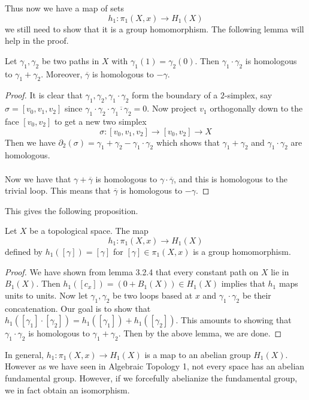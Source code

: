 \documentclass[a4paper]{article}
\begin{document}
Thus now we have a map of sets $$h_1:\pi_1(X,x)\to H_1(X)$$ we still need to show that it is a group homomorphism. The following lemma will help in the proof. 

\begin{lmm}{}{} Let $\gamma_1,\gamma_2$ be two paths in $X$ with $\gamma_1(1)=\gamma_2(0)$. Then $\gamma_1\cdot\gamma_2$ is homologous to $\gamma_1+\gamma_2$. Moreover, $\overline{\gamma}$ is homologous to $-\gamma$. \tcbline
\begin{proof}
It is clear that $\gamma_1,\gamma_2,\gamma_1\cdot\gamma_2$ form the boundary of a $2$-simplex, say $\sigma=[v_0,v_1,v_2]$ since $\gamma_1\cdot\gamma_2\cdot\overline{\gamma_1\cdot\gamma_2}=0$. Now project $v_1$ orthogonally down to the face $[v_0,v_2]$ to get a new two simplex $$\sigma:[v_0,v_1,v_2]\to[v_0,v_2]\to X$$ Then we have $\partial_2(\sigma)=\gamma_1+\gamma_2-\gamma_1\cdot\gamma_2$ which shows that $\gamma_1+\gamma_2$ and $\gamma_1\cdot\gamma_2$ are homologous. \\~\\

Now we have that $\gamma+\overline{\gamma}$ is homologous to $\gamma\cdot\overline{\gamma}$, and this is homologous to the trivial loop. This means that $\overline{\gamma}$ is homologous to $-\gamma$. 
\end{proof}
\end{lmm}

This gives the following proposition. 

\begin{prp}{}{} Let $X$ be a topological space. The map $$h_1:\pi_1(X,x)\to H_1(X)$$ defined by $h_1([\gamma])=[\gamma]$ for $[\gamma]\in\pi_1(X,x)$ is a group homomorphism. \tcbline
\begin{proof}
We have shown from lemma 3.2.4 that every constant path on $X$ lie in $B_1(X)$. Then $h_1([c_x])=(0+B_1(X))\in H_1(X)$ implies that $h_1$ maps units to units. Now let $\gamma_1,\gamma_2$ be two loops based at $x$ and $\gamma_1\cdot\gamma_2$ be their concatenation. Our goal is to show that $h_1([\gamma_1]\cdot[\gamma_2])=h_1([\gamma_1])+h_1([\gamma_2])$. This amounts to showing that $\gamma_1\cdot\gamma_2$ is homologous to $\gamma_1+\gamma_2$. Then by the above lemma, we are done. 
\end{proof}
\end{prp}

In general, $h_1:\pi_1(X,x)\to H_1(X)$ is a map to an abelian group $H_1(X)$. However as we have seen in Algebraic Topology 1, not every space has an abelian fundamental group. However, if we forcefully abelianize the fundamental group, we in fact obtain an isomorphism. 
\end{document}
